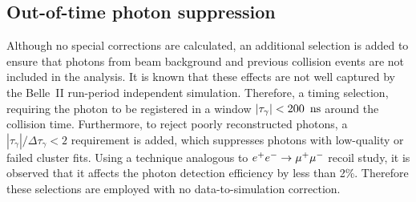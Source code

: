 \subsection{Out-of-time photon suppression}\label{sec:out_of_time_photon_suppression}

Although no special corrections are calculated, an additional selection is added to ensure that photons from beam background and previous collision events are not included in the analysis.
It is known that these effects are not well captured by the Belle~II run-period independent simulation.
Therefore, a timing selection, requiring the photon to be registered in a window $|\tau_{\gamma}|<200~{\rm \,ns}$ around the collision time.
Furthermore, to reject poorly reconstructed photons, a $|\tau_{\gamma}|/\Delta\tau_{\gamma}<2$ requirement is added, which suppresses photons with low-quality or failed cluster fits.
Using a technique analogous to $e^+e^-\rightarrow\mu^+\mu^-$ recoil study, it is observed that it affects the photon detection efficiency by less than 2\%.
Therefore these selections are employed with no data-to-simulation correction.

